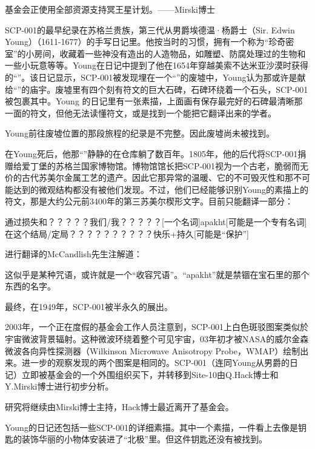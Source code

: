 \begin{scpbox}
\end{scpbox}

\begin{scpbox}
基金会正使用全部资源支持冥王星计划。——Mirski博士
\end{scpbox}


SCP-001的最早纪录在苏格兰贵族，第三代从男爵埃德温·杨爵士（Sir. Edwin Young）（1611-1677）的手写日记里。他按当时的习惯，拥有一个称为“珍奇密室”的小房间，收藏着一些神没有造出的人造物品，如雕塑、防腐处理过的生物和一些小玩意等等。Young在日记中提到了他在1654年穿越美索不达米亚沙漠时获得的“”。该日记显示，SCP-001被发现埋在一个“”的废墟中，Young认为那或许是献给“”的庙宇。废墟里有四个刻有符文的巨大石碑，石碑环绕着一个石头，SCP-001被包裹其中。Young 的日记里有一张素描，上面画有保存最完好的石碑最清晰那一面的符文，但他无法读懂符文，或是找到一个能把它翻译出来的学者。

Young前往废墟位置的那段旅程的纪录是不完整。因此废墟尚未被找到。

在Young死后，他那“”静静的在仓库躺了数百年。1805年，他的后代将SCP-001捐赠给爱丁堡的苏格兰国家博物馆。博物馆馆长把SCP-001视为一个古老，脆弱而无价的古代苏美尔金属工艺的遗产。因此它那异常的温暖、它的不可毁灭性和那不可能达到的微观结构都没有被他们发现。不过，他们已经能够识别Young的素描上的符文，那是大约公元前3400年的第三苏美尔楔形文字。目前只能翻译一部分：

\begin{scpbox}
通过损失和？？？？？我们/我？？？？？[一个名词]apakht[可能是一个专有名词]在这个结局/定局？？？？？？？？？？快乐+持久[可能是“保护”]
\end{scpbox}

进行翻译的McCandlish先生注解道：

\begin{scpbox}
这似乎是某种咒语，或许就是一个“收容咒语”。“apakht”就是禁锢在宝石里的那个东西的名字。
\end{scpbox}

最终，在1949年，SCP-001被半永久的展出。

2003年，一个正在度假的基金会工作人员注意到，SCP-001上白色斑驳图案类似於宇宙微波背景辐射。这种微波环绕着整个可见宇宙，03年初才被NASA的威尔金森微波各向异性探测器（Wilkinson Microwave Anisotropy Probe，WMAP）绘制出来。进一步的观察发现的两个图案是相同的。SCP-001（连同Young从男爵的日记）立即被基金会的一个外围组织买下，并转移到Site-10由Q.Hack博士和Y.Mirski博士进行初步分析。

研究将继续由Mirski博士主持，Hack博士最近离开了基金会。

Young的日记还包括一些SCP-001的详细素描。其中一个素描，一件看上去像是钥匙的装饰华丽的小物体安装进了“北极”里。但这件钥匙还没有被找到。
